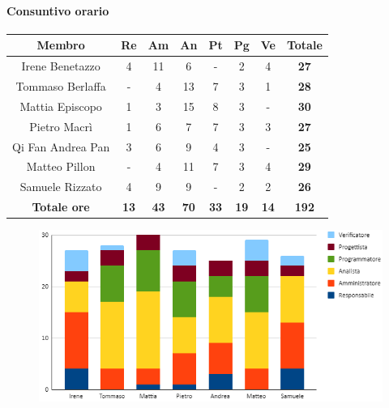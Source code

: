\paragraph{Consuntivo orario}
\begin{center}
	\renewcommand{\arraystretch}{1.8}
	\begin{tabular}{ |c|c|c|c|c|c|c|c| }
	\hline
	\textbf{Membro} & \textbf{Re} & \textbf{Am} &  \textbf{An} &  \textbf{Pt} &  \textbf{Pg} &  \textbf{Ve} &  \textbf{Totale}\\
    \hline
    Irene Benetazzo   & 4 & 11 & 6 & - & 2 & 4 & \textbf{27} \\
    \hline
    Tommaso Berlaffa  & - & 4 & 13 & 7 & 3 & 1 & \textbf{28} \\
    \hline
    Mattia Episcopo   & 1 & 3 & 15 & 8 & 3 & - & \textbf{30} \\
    \hline
    Pietro Macrì      & 1 & 6 & 7 & 7 & 3 & 3 & \textbf{27} \\
    \hline
    Qi Fan Andrea Pan & 3 & 6 & 9 & 4 & 3 & - & \textbf{25} \\
    \hline
    Matteo Pillon     & - & 4 & 11 & 7 & 3 & 4 & \textbf{29} \\
    \hline
    Samuele Rizzato   & 4 & 9 & 9 & - & 2 & 2 & \textbf{26} \\
    \hline
    \textbf{Totale ore} & \textbf{13} & \textbf{43} &  \textbf{70} &  \textbf{33} &  \textbf{19} &  \textbf{14} &  \textbf{192}\\
    \hline
	\end{tabular}
\end{center}
\begin{figure}[H]
    \centering\includegraphics[width=\textwidth, height=\textheight,keepaspectratio]{images/consuntivo/RTB-ore.png}
\end{figure}

